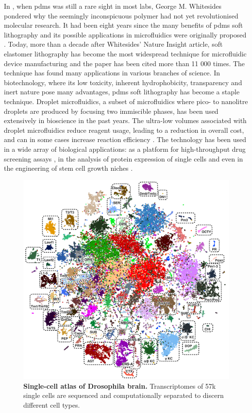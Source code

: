 In \citeyear{whitesides2006}, when \acrshort{pdms} was still a rare sight in most labs, George M. Whitesides pondered why the seemingly inconspicuous polymer had not yet revolutionised molecular research. It had been eight years since the many benefits of \acrshort{pdms} soft lithography and its possible applications in microfluidics were originally proposed \citep{xia1998}. Today, more than a decade after Whitesides' \citeyear{whitesides2006} Nature Insight article, soft elastomer lithography has become the most widespread technique for microfluidic device manufacturing and the \citeyear{xia1998} paper has been cited more than 11 000 times. The technique has found many applications in various branches of science. In biotechnology, where its low toxicity, inherent hydrophobicity, transparency and inert nature pose many advantages, \acrshort{pdms} soft lithography has become a staple technique. Droplet microfluidics, a subset of microfluidics where pico- to nanolitre droplets are produced by focusing two immiscible phases, has been used extensively in bioscience in the past years. The ultra-low volumes associated with droplet microfluidics reduce reagent usage, leading to a reduction in overall cost, and can in some cases increase reaction efficiency \citep{wu2014}. The technology has been used in a wide array of biological applications: as a platform for high-throughput drug screening assays \citep{brouzes2009}, in the analysis of protein expression of single cells \citep{huebner2007} and even in the engineering of stem cell growth niches \citep{allazetta2015}.\pms

\begin{figure}
\centering
\includegraphics[width=\textwidth/2]{./ims/davie.png}
\caption[Single-cell atlas of Drosophila brain]{\textbf{Single-cell atlas of Drosophila brain.} Transcriptomes of 57k single cells are sequenced and computationally separated to discern different cell types. \citep{davie2018}}
\label{fig:davie2018}
\vspace{-20pt}
\end{figure}

